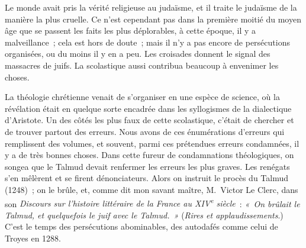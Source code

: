 \documentclass[french,twoside]{book} %
\newcommand\persName[1]{#1}
\newcommand\placeName[1]{#1}
\begin{document}
Le monde avait pris la vérité religieuse au judaïsme, et il traite le judaïsme de la manière la plus cruelle. Ce n’est cependant pas dans la première moitié du moyen âge que se passent les faits les plus déplorables, à cette époque, il y a malveillance ; cela est hors de doute ; mais il n’y a pas encore de persécutions organisées, ou du moins il y en a peu. Les croisades donnent le signal des massacres de juifs. La scolastique aussi contribua beaucoup à envenimer les choses.\par
La théologie chrétienne venait de s’organiser en une espèce de science, où la révélation était en quelque sorte encadrée dans les syllogismes de la dialectique d’{\persName Aristote}. Un des côtés les plus faux de cette scolastique, c’était de chercher et de trouver partout des erreurs. Nous avons de ces énumérations d’erreurs qui remplissent des volumes, et souvent, parmi ces prétendues erreurs condamnées, il y a de très bonnes choses. Dans cette fureur de condamnations théologiques, on songea que le Talmud devait renfermer les erreurs les plus graves. Les renégats s’en mêlèrent et se firent dénonciateurs. Alors on instruit le procès du Talmud (1248) ; on le brûle, et, comme dit mon savant maître, {\persName M. Victor Le Clerc}, dans son \emph{Discours sur l’histoire littéraire de la France au XIV\textsuperscript{e} siècle} : \emph{« On brûlait le Talmud, et quelquefois le juif avec le Talmud. »} ({\itshape Rires et applaudissements}.) C’est le temps des persécutions abominables, des autodafés comme celui de {\placeName Troyes} en 1288.\par
\end{document}
